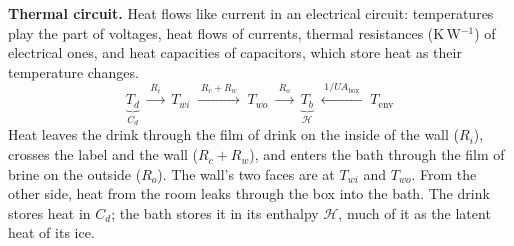 \documentclass[11pt,a4paper]{article}
\newcommand{\Hb}{\mathcal{H}}
\newcommand{\UAbox}{UA_{\mathrm{box}}}
\newcommand{\Tenv}{T_{\mathrm{env}}}
\begin{document}
\medskip
\textbf{Thermal circuit.} Heat flows like current in an electrical circuit: temperatures play the part of
voltages, heat flows of currents, thermal resistances (K\,W$^{-1}$) of electrical ones, and heat
capacities of capacitors, which store heat as their temperature changes.
\[
\underbrace{T_d}_{C_d}
\;\xrightarrow{\;R_i\;}\; T_{wi}
\;\xrightarrow{\;R_c+R_w\;}\; T_{wo}
\;\xrightarrow{\;R_o\;}\;
\underbrace{T_b}_{\Hb}
\;\xleftarrow{\;1/\UAbox\;}\; \Tenv
\]
Heat leaves the drink through the film of drink on the inside of the wall ($R_i$), crosses the label
and the wall ($R_c + R_w$), and enters the bath through the film of brine on the outside ($R_o$). The
wall's two faces are at $T_{wi}$ and $T_{wo}$. From the other side, heat from the room leaks through the
box into the bath. The drink stores heat in $C_d$; the bath stores it in its enthalpy $\Hb$, much of it
as the latent heat of its ice.
\end{document}

